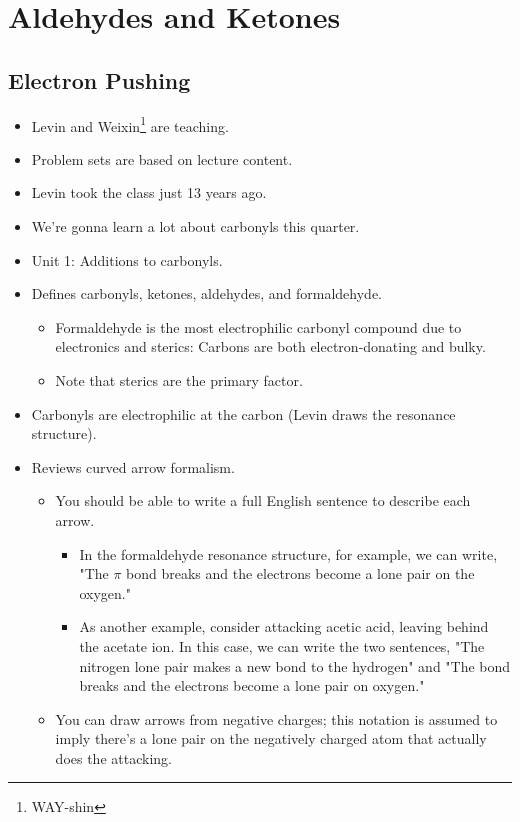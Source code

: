 \documentclass[../notes.tex]{subfiles}
\begin{document}
\chapter{Aldehydes and Ketones}
\section{Electron Pushing}
\begin{itemize}
    \item {}Levin and Weixin\footnote{WAY-shin} are teaching.
    \item Problem sets are based on lecture content.
    \item Levin took the class just 13 years ago.
    \item We're gonna learn a lot about carbonyls this quarter.
    \item Unit 1: Additions to carbonyls.
    \item Defines carbonyls, ketones, aldehydes, and formaldehyde.
    \begin{itemize}
        \item Formaldehyde is the most electrophilic carbonyl compound due to electronics and sterics: Carbons are both electron-donating and bulky.
        \item Note that sterics are the primary factor.
    \end{itemize}
    \item Carbonyls are electrophilic at the carbon (Levin draws the resonance structure).
    \item Reviews curved arrow formalism.
    \begin{itemize}
        \item You should be able to write a full English sentence to describe each arrow.
        \begin{itemize}
            \item In the formaldehyde resonance structure, for example, we can write, "The  $\pi$ bond breaks and the electrons become a lone pair on the oxygen."
            \item As another example, consider  attacking acetic acid, leaving behind the acetate ion. In this case, we can write the two sentences, "The nitrogen lone pair makes a new bond to the hydrogen" and "The  bond breaks and the electrons become a lone pair on oxygen."
        \end{itemize}
        \item You can draw arrows from negative charges; this notation is assumed to imply there's a lone pair on the negatively charged atom that actually does the attacking.

\end{itemize}
\end{itemize}
\end{document}

